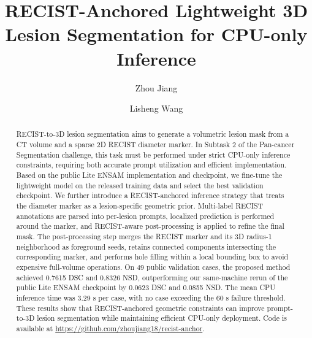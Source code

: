 \documentclass[runningheads]{llncs}
\begin{document}
\title{RECIST-Anchored Lightweight 3D Lesion Segmentation for CPU-only Inference}

\author{Zhou Jiang \and
Lisheng Wang}

\maketitle

\begin{abstract}
RECIST-to-3D lesion segmentation aims to generate a volumetric lesion mask from a CT volume and a sparse 2D RECIST diameter marker. In Subtask 2 of the Pan-cancer Segmentation challenge, this task must be performed under strict CPU-only inference constraints, requiring both accurate prompt utilization and efficient implementation. Based on the public Lite ENSAM implementation and checkpoint, we fine-tune the lightweight model on the released training data and select the best validation checkpoint. We further introduce a RECIST-anchored inference strategy that treats the diameter marker as a lesion-specific geometric prior. Multi-label RECIST annotations are parsed into per-lesion prompts, localized prediction is performed around the marker, and RECIST-aware post-processing is applied to refine the final mask. The post-processing step merges the RECIST marker and its 3D radius-1 neighborhood as foreground seeds, retains connected components intersecting the corresponding marker, and performs hole filling within a local bounding box to avoid expensive full-volume operations. On 49 public validation cases, the proposed method achieved 0.7615 DSC and 0.8326 NSD, outperforming our same-machine rerun of the public Lite ENSAM checkpoint by 0.0623 DSC and 0.0855 NSD. The mean CPU inference time was 3.29 s per case, with no case exceeding the 60 s failure threshold. These results show that RECIST-anchored geometric constraints can improve prompt-to-3D lesion segmentation while maintaining efficient CPU-only deployment. Code is available at \url{https://github.com/zhoujiang18/recist-anchor}.

\end{abstract}
\end{document}
